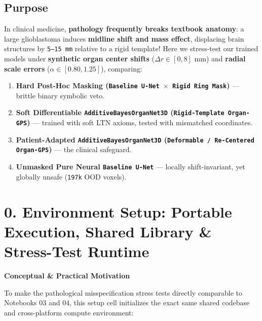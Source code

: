 \documentclass[10pt,a4paper]{article}
\renewcommand{\_}{\origunderscore\allowbreak}
\begin{document}
\subsection*{Purpose}
In clinical medicine, \textbf{pathology frequently breaks textbook anatomy}: a large glioblastoma induces \textbf{midline shift and mass effect}, displacing brain structures by \texttt{5--15 mm} relative to a rigid template! Here we stress-test our trained models under \textbf{synthetic organ center shifts} ($\Delta r \in [0, 8]\text{ mm}$) and \textbf{radial scale errors} ($\alpha \in [0.80, 1.25]$), comparing:
\begin{enumerate}
\item \textbf{Hard Post-Hoc Masking (\texttt{Baseline U-Net $\times$ Rigid Ring Mask})} --- brittle binary symbolic veto.
\item \textbf{Soft Differentiable \texttt{AdditiveBayesOrganNet3D} (\texttt{Rigid-Template Organ-GPS})} --- trained with soft LTN axioms, tested with mismatched coordinates.
\item \textbf{Patient-Adapted \texttt{AdditiveBayesOrganNet3D} (\texttt{Deformable /\allowbreak{} Re-Centered Organ-GPS})} --- the clinical safeguard.
\item \textbf{Unmasked Pure Neural \texttt{Baseline U-Net}} --- locally shift-invariant, yet globally unsafe (\texttt{197k} OOD voxels).
\end{enumerate}

\section*{0. Environment Setup: Portable Execution, Shared Library \& Stress-Test Runtime}

\begin{guidehdr}
{\small\bfseries\color{kiwigreen!75!black}Conceptual \& Practical Motivation}
\end{guidehdr}
To make the pathological misspecification stress tests directly comparable to Notebooks 03 and 04, this setup cell initializes the exact same shared codebase and cross-platform compute environment:
\end{document}
